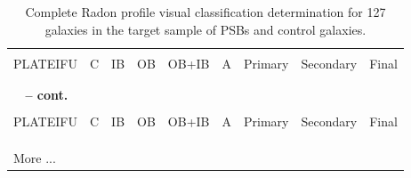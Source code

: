 \begin{longtable}{p{2.1cm}p{0.8cm}p{0.8cm}p{0.8cm}p{0.8cm}p{0.8cm}p{1.5cm}p{1.5cm}p{1.2cm}}
\caption{Complete Radon profile visual classification determination for 127 galaxies in the target sample of PSBs and control galaxies.}
\label{tab:full-visual-classification} \\

\hline
\\
PLATEIFU & C & IB & OB & OB+IB & A & Primary & Secondary & Final \\
\\
\hline
\\
\endfirsthead
%
{{\bfseries \tablename\ \thetable{} -- cont.}}
\\
\hline
\\
PLATEIFU & C & IB & OB & OB+IB & A & Primary & Secondary & Final \\
\\
\hline
\\
\endhead

\\
\hline 
{{More ...}}
\endfoot
\hline
\endlastfoot


\end{longtable}
